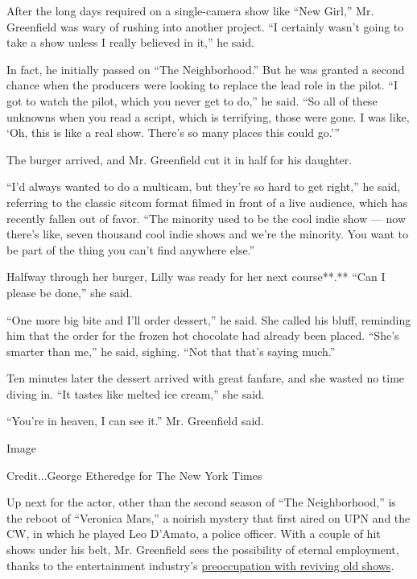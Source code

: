 After the long days required on a single-camera show like ``New Girl,''
Mr. Greenfield was wary of rushing into another project. ``I certainly
wasn't going to take a show unless I really believed in it,'' he said.

In fact, he initially passed on ``The Neighborhood.'' But he was granted
a second chance when the producers were looking to replace the lead role
in the pilot. ``I got to watch the pilot, which you never get to do,''
he said. ``So all of these unknowns when you read a script, which is
terrifying, those were gone. I was like, `Oh, this is like a real show.
There's so many places this could go.'''

The burger arrived, and Mr. Greenfield cut it in half for his daughter.

``I'd always wanted to do a multicam, but they're so hard to get
right,'' he said, referring to the classic sitcom format filmed in front
of a live audience, which has recently fallen out of favor. ``The
minority used to be the cool indie show --- now there's like, seven
thousand cool indie shows and we're the minority. You want to be part of
the thing you can't find anywhere else.''

Halfway through her burger, Lilly was ready for her next course**.**
``Can I please be done,'' she said.

``One more big bite and I'll order dessert,'' he said. She called his
bluff, reminding him that the order for the frozen hot chocolate had
already been placed. ``She's smarter than me,'' he said, sighing. ``Not
that that's saying much.''

Ten minutes later the dessert arrived with great fanfare, and she wasted
no time diving in. ``It tastes like melted ice cream,'' she said.

``You're in heaven, I can see it.'' Mr. Greenfield said.

Image

Credit...George Etheredge for The New York Times

Up next for the actor, other than the second season of ``The
Neighborhood,'' is the reboot of ``Veronica Mars,'' a noirish mystery
that first aired on UPN and the CW, in which he played Leo D'Amato, a
police officer. With a couple of hit shows under his belt, Mr.
Greenfield sees the possibility of eternal employment, thanks to the
entertainment industry's
\href{https://www.nytimes.com/2018/09/05/arts/television/fall-tv-revivals-reboots.html}{preoccupation
with reviving old shows}.

